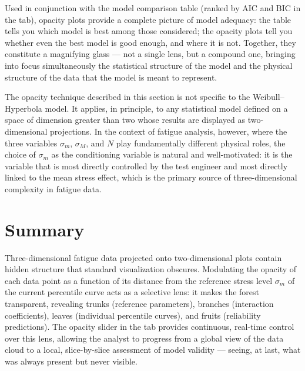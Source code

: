 Used in conjunction with the model comparison table (ranked by AIC and BIC in the  tab), opacity plots provide a complete picture of model adequacy: the table tells you which model is best among those considered; the opacity plots tell you whether even the best model is good enough, and where it is not. Together, they constitute a magnifying glass — not a single lens, but a compound one, bringing into focus simultaneously the statistical structure of the model and the physical structure of the data that the model is meant to represent.

\begin{importantbox}
  The opacity technique described in this section is not specific to the Weibull--Hyperbola model. It applies, in principle, to any statistical model defined on a space of dimension greater than two whose results are displayed as two-dimensional projections. In the context of fatigue analysis, however, where the three variables $\sigma_m$, $\sigma_M$, and $N$ play fundamentally different physical roles, the choice of $\sigma_m$ as the conditioning variable is natural and well-motivated: it is the variable that is most directly controlled by the test engineer and most directly linked to the mean stress effect, which is the primary source of three-dimensional complexity in fatigue data.
\end{importantbox}

\section{Summary}

Three-dimensional fatigue data projected onto two-dimensional plots contain hidden structure that standard visualization obscures. Modulating the opacity of each data point as a function of its distance from the reference stress level $\sigma_m$ of the current percentile curve acts as a selective lens: it makes the forest transparent, revealing trunks (reference parameters), branches (interaction coefficients), leaves (individual percentile curves), and fruits (reliability predictions). The opacity slider in the  tab provides continuous, real-time control over this lens, allowing the analyst to progress from a global view of the data cloud to a local, slice-by-slice assessment of model validity — seeing, at last, what was always present but never visible.

